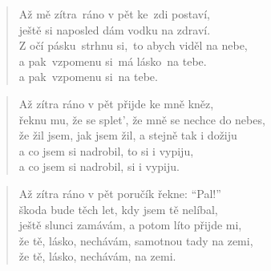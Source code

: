 \begin{song}{}
\begin{verse}
   Až mě zítra~ráno v pět ke~zdi postaví, \\
   ještě si naposled dám vodku na zdraví. \\
   Z očí pásku~strhnu si,~to abych viděl na nebe,   \\
   a pak~vzpomenu si~má lásko~na tebe.             \\
   a pak~vzpomenu si~na tebe.
\end{verse}
\begin{verse}
   Až zítra ráno v pět přijde ke mně kněz, \\
   řeknu mu, že se splet', že mně se nechce do nebes, \\
   že žil jsem, jak jsem žil, a stejně tak i dožiju \\
   a co jsem si nadrobil, to si i vypiju, \\
   a co jsem si nadrobil, si i vypiju.
\end{verse}
\begin{verse}
   Až zítra ráno v pět poručík řekne: \enquote{Pal!}  \\
   škoda bude těch let, kdy jsem tě nelíbal, \\
   ještě slunci zamávám, a potom líto přijde mi, \\
   že tě, lásko, nechávám, samotnou tady na zemi, \\
   že tě, lásko, nechávám, na zemi.
\end{verse}
\chordbreak
\begin{verse}
\end{verse}
\end{song}
\pagebreak
